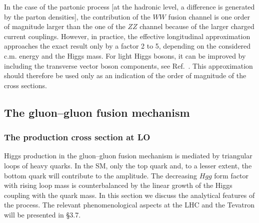 In the case of the partonic process [at the hadronic level, a difference is
generated by the parton densities], the contribution of the $WW$ fusion channel
is one order of magnitude larger than the one of the $ZZ$ channel because of
the larger charged current couplings.  However, in practice, the effective
longitudinal approximation approaches the exact result only by a factor 2 to 5,
depending on the considered c.m. energy and the Higgs mass. For light Higgs
bosons, it can be improved by including the transverse vector boson components,
see Ref.~\cite{WWA-trans}. This approximation should therefore be used only as 
an indication of the order of magnitude of the cross sections.  

\subsection{The gluon--gluon fusion mechanism}
\subsubsection{The production cross section at LO}

Higgs production in the gluon--gluon fusion mechanism is mediated by triangular
loops of heavy quarks. In the SM, only the top quark and, to a lesser extent,
the bottom quark will contribute to the amplitude. The decreasing $Hgg$ form
factor with rising loop mass is counterbalanced by the linear growth of the
Higgs coupling with the quark mass. In this section we discuss the analytical
features of the process. The relevant phenomenological aspects at the LHC 
\cite{pp-EHLQ,pp-Galison,pp-Wudka,pp-HWW-Theory,pp-HZZ-llnnTheory,pp-ggH-tau-old,pp-ggH-mu,pp-ggH-mu-others} and the Tevatron \cite{pp-WW-TeV,pp-WW-TeV-E,pp-tau-TeV} will 
be presented in \S3.7.\s


